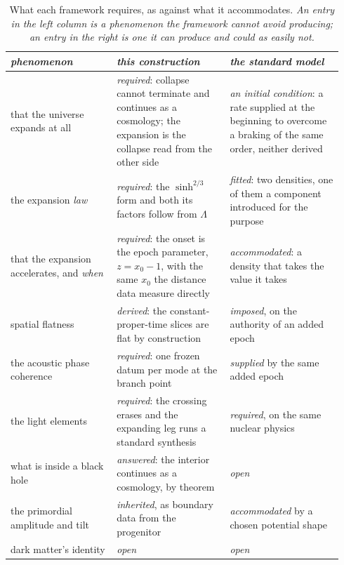 \documentclass[11pt,a4paper]{article}
\theoremstyle{plain}
\theoremstyle{definition}
\begin{document}
\begin{table}[t]
\centering\small
\caption{What each framework requires, as against what it accommodates. \emph{An entry in the left column is
a phenomenon the framework cannot avoid producing; an entry in the right is one it can produce and could as
easily not.}}\label{tab:required}
\begin{tabular}{@{}p{0.30\linewidth}p{0.32\linewidth}p{0.32\linewidth}@{}}
\hline
\emph{phenomenon} & \emph{this construction} & \emph{the standard model} \\
\hline
that the universe expands at all & \emph{required}: collapse cannot terminate and continues as a cosmology;
the expansion is the collapse read from the other side & \emph{an initial condition}: a rate supplied at the
beginning to overcome a braking of the same order, neither derived \\
the expansion \emph{law} & \emph{required}: the $\sinh^{2/3}$ form and both its factors follow from
$\Lambda$ & \emph{fitted}: two densities, one of them a component introduced for the purpose \\
that the expansion accelerates, and \emph{when} & \emph{required}: the onset is the epoch parameter, $z=x_0-1$,
with the same $x_0$ the distance data measure directly &
\emph{accommodated}: a density that takes the value it takes \\
spatial flatness & \emph{derived}: the constant-proper-time slices are flat by construction &
\emph{imposed}, on the authority of an added epoch \\
the acoustic phase coherence & \emph{required}: one frozen datum per mode at the branch point &
\emph{supplied} by the same added epoch \\
the light elements & \emph{required}: the crossing erases and the expanding leg runs a standard synthesis &
\emph{required}, on the same nuclear physics \\
what is inside a black hole & \emph{answered}: the interior continues as a cosmology, by theorem &
\emph{open} \\
the primordial amplitude and tilt & \emph{inherited}, as boundary data from the progenitor & \emph{accommodated} by a chosen
potential shape \\
dark matter's identity & \emph{open} & \emph{open} \\
\hline
\end{tabular}
\end{table}
\end{document}
